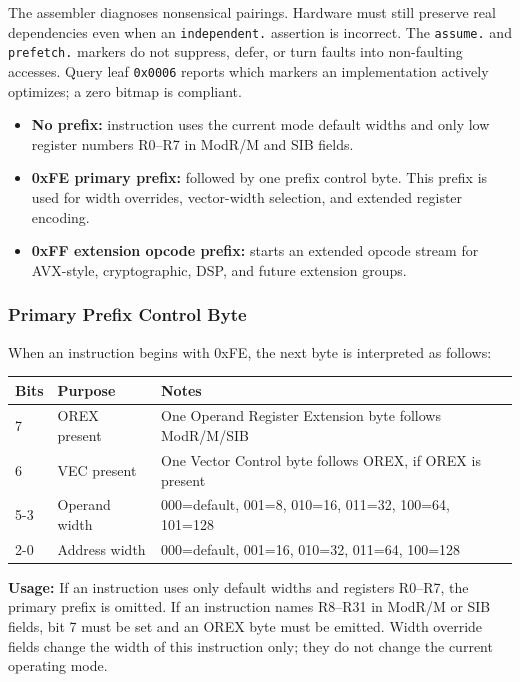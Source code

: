\documentclass[11pt]{article}
\begin{document}
The assembler diagnoses nonsensical pairings. Hardware must still preserve real
dependencies even when an \texttt{independent.} assertion is incorrect. The
\texttt{assume.} and \texttt{prefetch.} markers do not suppress, defer, or turn
faults into non-faulting accesses. Query leaf \texttt{0x0006} reports which
markers an implementation actively optimizes; a zero bitmap is compliant.

\begin{itemize}
    \item \textbf{No prefix:} instruction uses the current mode default widths and only low register numbers R0--R7 in ModR/M and SIB fields.
    \item \textbf{0xFE primary prefix:} followed by one prefix control byte. This prefix is used for width overrides, vector-width selection, and extended register encoding.
    \item \textbf{0xFF extension opcode prefix:} starts an extended opcode stream for AVX-style, cryptographic, DSP, and future extension groups.
\end{itemize}

\subsubsection{Primary Prefix Control Byte}

When an instruction begins with 0xFE, the next byte is interpreted as follows:

\begin{table}[h]
\centering
\begin{tabular}{@{}lll@{}}
\toprule
\textbf{Bits} & \textbf{Purpose} & \textbf{Notes} \\ \midrule
7 & OREX present & One Operand Register Extension byte follows ModR/M/SIB \\
6 & VEC present & One Vector Control byte follows OREX, if OREX is present \\
5-3 & Operand width & 000=default, 001=8, 010=16, 011=32, 100=64, 101=128 \\
2-0 & Address width & 000=default, 001=16, 010=32, 011=64, 100=128 \\ \bottomrule
\end{tabular}
\end{table}

\textbf{Usage:} If an instruction uses only default widths and registers R0--R7, the primary prefix is omitted. If an instruction names R8--R31 in ModR/M or SIB fields, bit 7 must be set and an OREX byte must be emitted. Width override fields change the width of this instruction only; they do not change the current operating mode.
\end{document}
